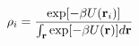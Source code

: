 \documentclass[12pt]{article}
\begin{document}
\begin{displaymath}
\rho_i = 
{
{
\exp[-\beta U({\bf r}_i)]
}
\over
{
\int_{\bf r}
{ \exp[-\beta U({\bf r}) ] }
d{\bf r}
}
}
\end{displaymath}
\end{document}
